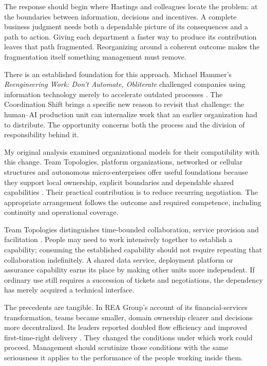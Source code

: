 \begin{EssayColumns}\GutterQuote

The response should begin where Hastings and colleagues locate the
problem: at the boundaries between information, decisions and
incentives. A complete business judgment needs both a dependable picture
of its consequences and a path to action. Giving each department a
faster way to produce its contribution leaves that path fragmented.
Reorganizing around a coherent outcome makes the fragmentation itself
something management must remove.

There is an established foundation for this approach. Michael Hammer's
\emph{Reengineering Work: Don't Automate, Obliterate} challenged
companies using information technology merely to accelerate outdated
processes \citep{hammer1990reengineering}. The Coordination Shift brings
a specific new reason to revisit that challenge: the human--AI
production unit can internalize work that an earlier organization had to
distribute. The opportunity concerns both the process and the division
of responsibility behind it.

My original analysis examined organizational models for their
compatibility with this change. Team Topologies, platform organizations,
networked or cellular structures and autonomous micro-enterprises offer
useful foundations because they support local ownership, explicit
boundaries and dependable shared capabilities
\citep{blomgren2025coordination}. Their practical contribution is to
reduce recurring negotiation. The appropriate arrangement follows the
outcome and required competence, including continuity and operational
coverage.

\NextGutterColumn

Team Topologies distinguishes time-bounded collaboration, service
provision and facilitation \citep{teamtopologiesconcepts}. People may
need to work intensively together to establish a capability; consuming
the established capability should not require repeating that
collaboration indefinitely. A shared data service, deployment platform
or assurance capability earns its place by making other units more
independent. If ordinary use still requires a succession of tickets and
negotiations, the dependency has merely acquired a technical interface.

The precedents are tangible. In REA Group's account of its
financial-services transformation, teams became smaller, domain
ownership clearer and decisions more decentralized. Its leaders reported
doubled flow efficiency and improved first-time-right delivery
\citep{devine2026rea}. They changed the conditions under which work
could proceed. Management should scrutinize those conditions with the
same seriousness it applies to the performance of the people working
inside them.


\end{EssayColumns}
